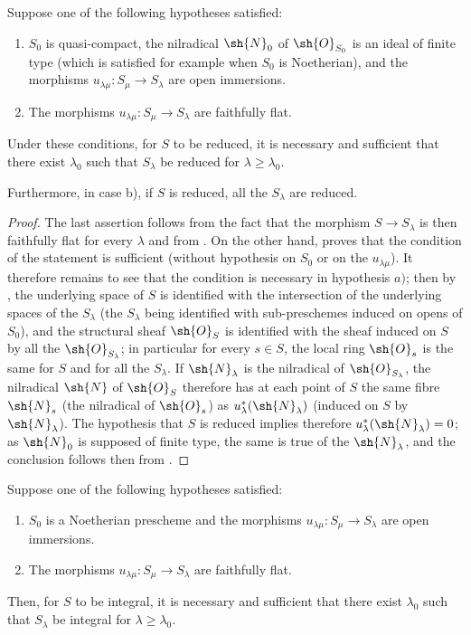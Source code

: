 \begin{proposition}[8.7.2]
\label{IV.8.7.2}
Suppose one of the following hypotheses satisfied:
\begin{enumerate}[label=\emph{\alph*)}]
\item $S_0$ is quasi-compact, the nilradical $\sh{N}_0$ of $\sh{O}_{S_0}$ is an ideal of finite type (which is satisfied for example when $S_0$ is Noetherian), and the morphisms $u_{\lambda\mu}:S_\mu\to S_\lambda$ are open immersions.
\item The morphisms $u_{\lambda\mu}:S_\mu\to S_\lambda$ are faithfully flat.
\end{enumerate}
Under these conditions, for $S$ to be reduced, it is necessary and sufficient that there exist $\lambda_0$ such that $S_\lambda$ be reduced for $\lambda\geqslant\lambda_0$.

Furthermore, in case b), if $S$ is reduced, all the $S_\lambda$ are reduced.
\end{proposition}

\begin{proof}
The last assertion follows from the fact that the morphism $S\to S_\lambda$ is then faithfully flat for every $\lambda$  and from .
On the other hand,  proves that the condition of the statement is sufficient (without hypothesis on $S_0$ or on the $u_{\lambda\mu}$).
It therefore remains to see that the condition is necessary in hypothesis $a)$; then by , the underlying space of $S$ is identified with the intersection of the underlying spaces of the $S_\lambda$ (the $S_\lambda$ being identified with sub-preschemes induced on opens of $S_0$), and the structural sheaf $\sh{O}_S$ is identified with
the sheaf induced on $S$ by all the $\sh{O}_{S_\lambda}$; in particular for every $s\in S$, the local ring $\sh{O}_s$ is the same for $S$ and for all the $S_\lambda$.
If $\sh{N}_\lambda$ is the nilradical of $\sh{O}_{S_\lambda}$, the nilradical $\sh{N}$ of $\sh{O}_S$ therefore has at each point of $S$ the same fibre $\sh{N}_s$ (the nilradical of $\sh{O}_s$) as $u_\lambda^*(\sh{N}_\lambda)$ (induced on $S$ by $\sh{N}_\lambda$).
The hypothesis that $S$ is reduced implies therefore $u_\lambda^*(\sh{N}_\lambda)=0$; as $\sh{N}_0$ is supposed of finite type, the same is true of the $\sh{N}_\lambda$, and the conclusion follows then from .
\end{proof}

\begin{corollary}[8.7.3]
\label{IV.8.7.3}
Suppose one of the following hypotheses satisfied:
\begin{enumerate}[label=\emph{\alph*)}]
\item $S_0$ is a Noetherian prescheme and the morphisms $u_{\lambda\mu}:S_\mu\to S_\lambda$ are open immersions.
\item The morphisms $u_{\lambda\mu}:S_\mu\to S_\lambda$ are faithfully flat.
\end{enumerate}
Then, for $S$ to be integral, it is necessary and sufficient that there exist $\lambda_0$ such that $S_\lambda$ be integral for $\lambda\geqslant\lambda_0$.
\end{corollary}


